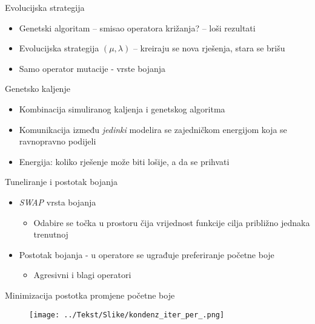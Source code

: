 \documentclass[utf8]{beamer}
\begin{document}
\begin{frame}{Evolucijska strategija}
	\begin{itemize}
		\item Genetski algoritam -- smisao operatora križanja? -- loši rezultati
		\pause
		\item Evolucijska strategija $(\mu, \lambda)$ -- kreiraju se nova rješenja, stara se brišu
		\pause
		\item Samo operator mutacije - vrste bojanja
		\end{itemize}
\end{frame}

\begin{frame}{Genetsko kaljenje}
	\begin{itemize}
		\item Kombinacija simuliranog kaljenja i genetskog algoritma
		\pause
		\item Komunikacija između \emph{jedinki} modelira se zajedničkom energijom koja se ravnopravno podijeli
		\pause
		\item Energija: koliko rješenje može biti lošije, a da se prihvati
	\end{itemize}
\end{frame}


\begin{frame}{Tuneliranje i postotak bojanja}
	\begin{itemize}
		\item \emph{SWAP} vrsta bojanja
		\pause
		\begin{itemize}
			\item Odabire se točka u prostoru čija vrijednost funkcije cilja približno jednaka trenutnoj
		\end{itemize}
		\pause
		\item Postotak bojanja - u operatore se ugrađuje preferiranje početne boje
		\begin{itemize}
			\item Agresivni i blagi operatori
		\end{itemize}
	\end{itemize}
\end{frame}

\begin{frame}{Minimizacija postotka promjene početne boje}
\begin{figure}[h]
  \centering
  \texttt{[image: ../Tekst/Slike/kondenz\_iter\_per\_.png]}
\end{figure}
\end{frame}
\end{document}
